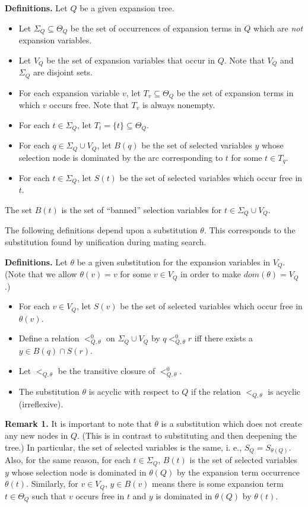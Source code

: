 {\bf Definitions.}  Let $Q$ be a given expansion tree.  
\begin{itemize}
\item Let $\Sigma_Q\subseteq \Theta_Q$ be the set of occurrences of expansion terms in $Q$
which are {\it not} expansion variables.
\item Let $V_Q$ be the set of expansion variables
that occur in $Q$.  Note that $V_Q$ and $\Sigma_Q$ are disjoint sets.
\item For each expansion variable $v$, let $T_v \subseteq \Theta_Q$ be the set
of expansion terms in which $v$ occurs free.  Note that $T_v$ is always nonempty.
\item For each $t\in \Sigma_Q$, let $T_t = \{t\} \subseteq \Theta_Q$.
\item For each $q\in\Sigma_Q \cup V_Q$, let $B(q)$ be the set of selected variables
$y$ whose selection node is dominated by the arc corresponding to $t$ for some $t\in T_q$.  
\item For each $t\in\Sigma_Q$, let $S(t)$ be the set of selected variables which
occur free in $t$.
\end{itemize}

The set $B(t)$ is the set of ``banned'' selection variables for $t\in\Sigma_Q\cup V_Q$.

The following definitions depend upon a substitution $\theta$.  This corresponds
to the substitution found by unification during mating search.

{\bf Definitions.} Let $\theta$ be a given substitution for the expansion variables in $V_Q$.
(Note that we allow $\theta(v) = v$ for some $v\in V_Q$ in order to make $dom(\theta) = V_Q$.)
\begin{itemize}
\item For each $v\in V_Q$, let $S(v)$ be the set of selected variables which occur
free in $\theta(v)$.
\item Define a relation $<^0_{Q,\theta}$ on $\Sigma_Q\cup V_Q$ by
$q <^0_{Q,\theta} r$ iff there exists a $y\in B(q)\cap S(r)$.
\item Let $<_{Q,\theta}$ be the transitive closure of $<^0_{Q,\theta}$.
\item The substitution $\theta$ is acyclic with respect to $Q$ if
the relation $<_{Q,\theta}$ is acyclic
(irreflexive).
\end{itemize}

{\bf Remark 1.}  It is important to note that $\theta$ is a substitution which does not create
any new nodes in $Q$.  (This is in contrast to substituting and then deepening the tree.)
In particular, the set of selected variables is the same, i. e., $S_Q = S_{\theta(Q)}$.  
Also, for the same reason, for each $t\in\Sigma_Q$, $B(t)$ is the set of selected variables $y$
whose selection node is dominated in $\theta(Q)$ by the expansion term occurrence $\theta(t)$.  
Similarly, for $v\in V_Q$, $y\in B(v)$ means there is some expansion term $t\in\Theta_Q$
such that $v$ occurs free in $t$ and $y$ is dominated in $\theta(Q)$
by $\theta(t)$.


